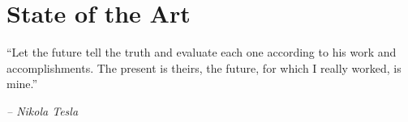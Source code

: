 \chapter{State of the Art}\label{ch:chapter3}
\epigraph{``Let the future tell the truth and evaluate each one according to his work and accomplishments. The present is theirs, the future, for which I really worked, is mine.''}{\textit{-- Nikola Tesla}}

	\lipsum[1]

	\lipsum[3]